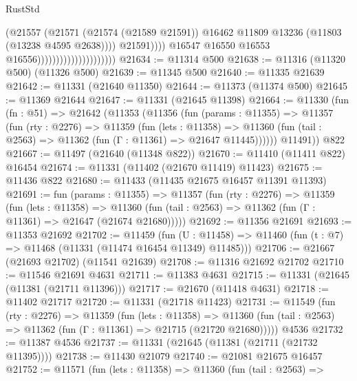 \begin{lexlean}{RustStd}
\begin{coremodule}
                                                      (@21557
                                                        (@21571
                                                          (@21574 (@21589 @21591))
                                                          @16462
                                                          @11809
                                                          @13236
                                                          (@11803 (@13238 @4595 @2638))))
                                                      @21591))))
                                              @16547
                                              @16550
                                              @16553
                                              @16556)))))))))))))))))))))
@21634 := @11314 @500
@21638 := @11316 (@11320 @500) (@11326 @500)
@21639 := @11345 @500
@21640 := @11335 @21639
@21642 := @11331 (@21640 @11350)
@21644 := @11373 (@11374 @500)
@21645 := @11369 @21644
@21647 := @11331 (@21645 @11398)
@21664 := @11330
    (fun (fn : @51) =>
    @21642
      (@11353
        (@11356
          (fun (params : @11355) =>
          @11357
            (fun (rty : @2276) =>
            @11359
              (fun (lets : @11358) =>
              @11360 (fun (tail : @2563) => @11362 (fun (Γ : @11361) => @21647 @11445))))))
        @11491))
    @822
@21667 := @11497 (@21640 (@11348 @822))
@21670 := @11410 (@11411 @822) @16454
@21674 := @11331 (@11402 (@21670 @11419) @11423)
@21675 := @11436 @822
@21680 := @11433 (@11435 @21675 @16457 @11391 @11393)
@21691 := fun (params : @11355) =>
  @11357
    (fun (rty : @2276) =>
    @11359
      (fun (lets : @11358) =>
      @11360 (fun (tail : @2563) => @11362 (fun (Γ : @11361) => @21647 (@21674 @21680)))))
@21692 := @11356 @21691
@21693 := @11353 @21692
@21702 := @11459
    (fun (U : @11458) => @11460 (fun (t : @7) => @11468 (@11331 (@11474 @16454 @11349) @11485)))
@21706 := @21667 (@21693 @21702) (@11541 @21639)
@21708 := @11316 @21692 @21702
@21710 := @11546 @21691 @4631
@21711 := @11383 @4631
@21715 := @11331 (@21645 (@11381 (@21711 @11396)))
@21717 := @21670 (@11418 @4631)
@21718 := @11402 @21717
@21720 := @11331 (@21718 @11423)
@21731 := @11549
    (fun (rty : @2276) =>
    @11359
      (fun (lets : @11358) =>
      @11360 (fun (tail : @2563) => @11362 (fun (Γ : @11361) => @21715 (@21720 @21680)))))
    @4536
@21732 := @11387 @4536
@21737 := @11331 (@21645 (@11381 (@21711 (@21732 @11395))))
@21738 := @11430 @21079
@21740 := @21081 @21675 @16457
@21752 := @11571
    (fun (lets : @11358) =>
    @11360
      (fun (tail : @2563) =>

\end{coremodule}
\end{lexlean}
